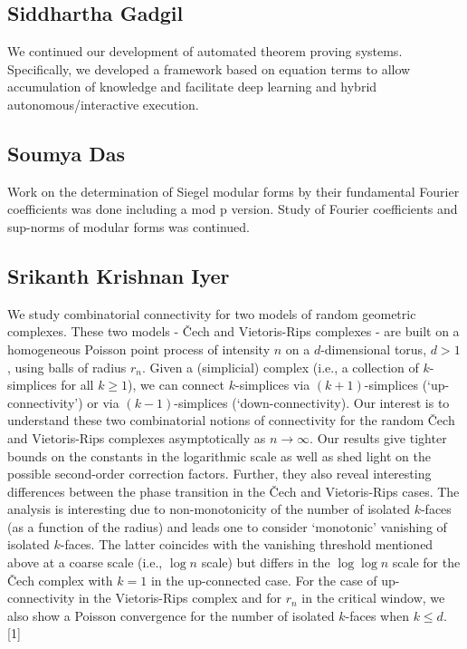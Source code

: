 \subsection{Siddhartha Gadgil}

We continued our development of automated theorem proving systems. Specifically, we developed a framework based on equation terms to allow accumulation of knowledge and facilitate deep learning and hybrid autonomous/interactive execution.


\subsection{Soumya Das}

Work on the determination of Siegel modular forms by their fundamental Fourier coefficients was done including a mod p version. Study of Fourier coefficients and sup-norms of modular forms was continued.


\subsection{Srikanth Krishnan Iyer}

We study combinatorial connectivity for two models of random geometric complexes. These two models - \v{C}ech and Vietoris-Rips complexes - are built on a homogeneous Poisson point process of intensity $n$ on a $d$-dimensional torus, $d > 1$, using balls of radius $r_n$. Given a (simplicial) complex (i.e., a collection of $k$-simplices for all $k \geq 1$), we can connect $k$-simplices via $(k+1)$-simplices (`up-connectivity') or via $(k-1)$-simplices (`down-connectivity). Our interest is to understand these two combinatorial notions of connectivity for the random \v{C}ech and Vietoris-Rips complexes asymptotically as $n \to \infty$. Our results give tighter bounds on the constants in the logarithmic scale as well as shed light on the possible second-order correction factors. Further, they also reveal interesting differences between the phase transition in the \v{C}ech and Vietoris-Rips cases. The analysis is interesting due to non-monotonicity of the number of isolated $k$-faces (as a function of the radius) and leads one to consider `monotonic' vanishing of isolated $k$-faces. The latter coincides with the vanishing threshold mentioned above at a coarse scale (i.e., $\log n$ scale) but differs in the $\log \log n$ scale for the \v{C}ech complex with $k = 1$ in the up-connected case. For the case of up-connectivity in the Vietoris-Rips complex and for $r_n$ in the critical window, we also show a Poisson convergence for the number of isolated $k$-faces when $k \leq d$. [1]



